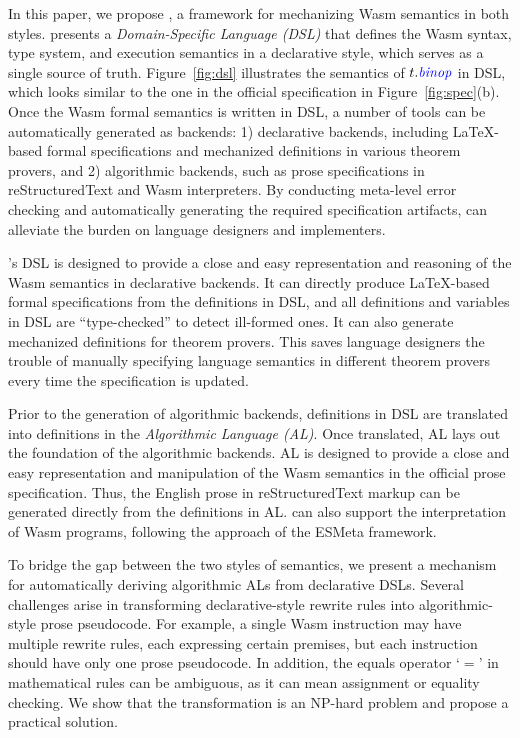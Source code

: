 In this paper, we propose \spectec, a framework for mechanizing Wasm semantics in both styles.
\spectec presents a \emph{Domain-Specific Language (DSL)} that
defines the Wasm syntax, type system, and execution semantics in a declarative style,
which serves as a single source of truth.
Figure~\ref{fig:dsl} illustrates the semantics of $t.\mathit{{\color{blue}{binop}}}$ in DSL,
which looks similar to the one in the official specification in Figure~\ref{fig:spec}(b).
Once the Wasm formal semantics is written in DSL,
a number of tools can be automatically generated as backends:
1) declarative backends, including LaTeX-based formal specifications and
mechanized definitions in various theorem provers, and
2) algorithmic backends, such as prose specifications in reStructuredText and Wasm interpreters.
By conducting meta-level error checking and automatically generating the required specification artifacts,
\spectec can alleviate the burden on language designers and implementers.

\spectec's DSL is designed to provide a close and easy representation and reasoning of
the Wasm semantics in declarative backends.
It can directly produce LaTeX-based formal specifications from the definitions in DSL,
and all definitions and variables in DSL are ``type-checked'' to detect ill-formed ones.
It can also generate mechanized definitions for theorem provers.
This saves language designers the trouble of manually specifying
language semantics in different theorem provers every time the specification is updated.

Prior to the generation of algorithmic backends,
definitions in DSL are translated into definitions in the \emph{Algorithmic Language (AL)}.
Once translated, AL lays out the foundation of the algorithmic backends.
AL is designed to provide a close and easy representation and manipulation of
the Wasm semantics in the official prose specification.
Thus, the English prose in reStructuredText markup can be generated directly from the definitions in AL.
\spectec can also support the interpretation of Wasm programs,
following the approach of the ESMeta framework.

To bridge the gap between the two styles of semantics,
we present a mechanism for automatically deriving algorithmic ALs from declarative DSLs.
Several challenges arise in transforming declarative-style rewrite rules
into algorithmic-style prose pseudocode.
For example, a single Wasm instruction may have multiple rewrite rules,
each expressing certain premises,
but each instruction should have only one prose pseudocode. 
In addition, the equals operator `$=$' in mathematical rules
can be ambiguous, as it can mean assignment or equality checking.
We show that the transformation is an NP-hard problem
and propose a practical solution.

